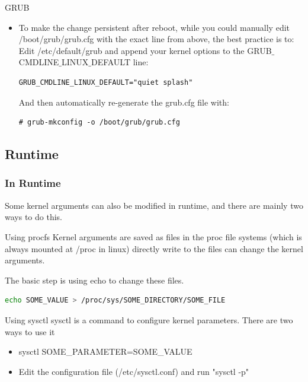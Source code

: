 \documentclass{beamer}
\begin{document}
\begin{frame}[fragile]
	\begin{block}{GRUB}
	 \begin{itemize}
       \item To make the change persistent after reboot, while you could manually edit /boot/grub/grub.cfg with the exact line from above, the best practice is to:\\
\vspace{0.5cm}
Edit /etc/default/grub and append your kernel options to the GRUB$\_$CMDLINE$\_$LINUX$\_$DEFAULT line:
\begin{lstlisting}
GRUB_CMDLINE_LINUX_DEFAULT="quiet splash"
\end{lstlisting}
And then automatically re-generate the grub.cfg file with:
\begin{lstlisting}
# grub-mkconfig -o /boot/grub/grub.cfg
\end{lstlisting}
     \end{itemize}
	\end{block}
	
\end{frame}

\begin{frame}[fragile]
    \subsection{Runtime}
	\frametitle{In Runtime}
	Some kernel arguments can also be modified in runtime, and there are mainly two ways to do this.
	\begin{block}{Using procfs}
		Kernel arguments are saved as files in the proc file systems (which is always mounted at /proc in linux) directly write to the files can change the kernel arguments.
	\end{block}
    The basic step is using {\color{blue} echo} to change these files.

    
    \begin{lstlisting}[language=bash]
    echo SOME_VALUE > /proc/sys/SOME_DIRECTORY/SOME_FILE
    \end{lstlisting}
    
\end{frame}

\begin{frame}
    \begin{block}{Using sysctl}
        {\color{blue}sysctl }is a command to configure kernel parameters. There are two ways to use it
        \begin{itemize}
            \item sysctl SOME\_PARAMETER=SOME\_VALUE
            \item Edit the configuration file (/etc/sysctl.conf) and run "sysctl -p"
        \end{itemize}
    \end{block}
	
\end{frame}
\end{document}
